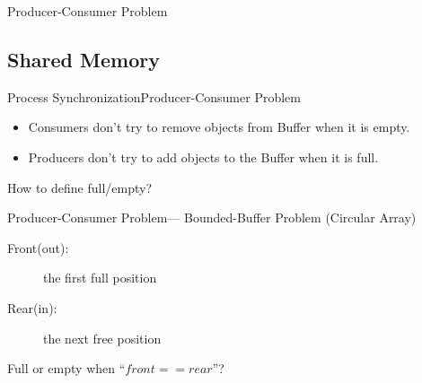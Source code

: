 \begin{frame}{Producer-Consumer Problem}
\begin{center}
   
\end{center}
\end{frame}

\subsection{Shared Memory}
\label{sec:shared-memory}

\begin{frame}{Process Synchronization}{Producer-Consumer Problem}
  \begin{itemize}
  \item Consumers don't try to remove objects from Buffer when it is empty.
  \item Producers don't try to add objects to the Buffer when it is full.
  \end{itemize}
  \begin{center}
     
  \end{center}
  \begin{center}
    How to define \alert{full/empty}?
  \end{center}
\end{frame}

\begin{frame}{Producer-Consumer Problem}{--- Bounded-Buffer Problem (Circular Array)}
  \begin{minipage}{.65\linewidth}
  \begin{description}
  \item[Front(out):] the first full position
  \item[Rear(in):] the next free position
  \end{description}
  \end{minipage}\quad
  \begin{minipage}{.3\linewidth}
  \end{minipage}
  Full or empty when ``$front == rear$''?
\end{frame}

